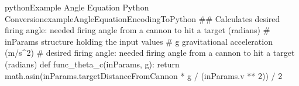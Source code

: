 \begin{pseudocode}{python}{Example Angle Equation Python Conversion}{exampleAngleEquationEncodingToPython}
## \brief Calculates desired firing angle: needed firing angle from a cannon to hit a target (radians)
# \param inParams structure holding the input values
# \param g gravitational acceleration (m/s^2)
# \return desired firing angle: needed firing angle from a cannon to hit a target (radians)
def func_theta_c(inParams, g):
    return math.asin(inParams.targetDistanceFromCannon * g / (inParams.v ** 2)) / 2
\end{pseudocode}
